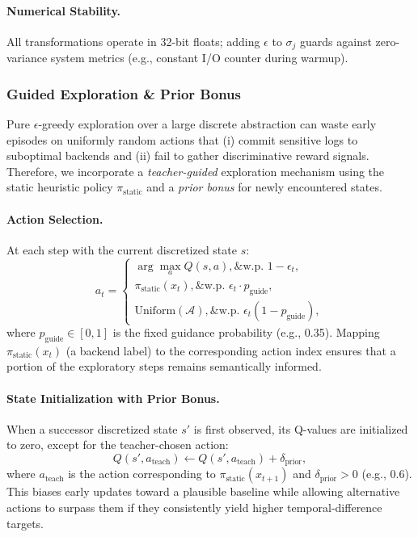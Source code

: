 \paragraph{Numerical Stability.}
All transformations operate in 32-bit floats; adding $\epsilon$ to $\sigma_j$ guards against zero-variance system metrics (e.g., constant I/O counter during warmup).

\subsubsection{Guided Exploration \& Prior Bonus}
\label{subsubsec:qlearn-guided}

Pure $\epsilon$-greedy exploration over a large discrete abstraction can waste early episodes on uniformly random actions that (i) commit sensitive logs to suboptimal backends and (ii) fail to gather discriminative reward signals. Therefore, we incorporate a \emph{teacher-guided} exploration mechanism using the static heuristic policy $\pi_{\text{static}}$ and a \emph{prior bonus} for newly encountered states.

\paragraph{Action Selection.}
At each step with the current discretized state $s$:
\[
a_t =
\begin{cases}
\arg\max_a Q(s,a),\& \text{w.p. } 1-\epsilon_t,\\[4pt]
\pi_{\text{static}}(x_t),\& \text{w.p. } \epsilon_t \cdot p_{\text{guide}},\\[4pt]
\text{Uniform}(\mathcal{A}),\& \text{w.p. } \epsilon_t (1-p_{\text{guide}}),
\end{cases}
\]
where $p_{\text{guide}} \in [0,1]$ is the fixed guidance probability (e.g., 0.35). Mapping $\pi_{\text{static}}(x_t)$ (a backend label) to the corresponding action index ensures that a portion of the exploratory steps remains semantically informed.

\paragraph{State Initialization with Prior Bonus.}
When a successor discretized state $s'$ is first observed, its Q-values are initialized to zero, except for the teacher-chosen action:
\[
Q(s', a_{\text{teach}}) \gets Q(s', a_{\text{teach}}) + \delta_{\text{prior}},
\]
where $a_{\text{teach}}$ is the action corresponding to $\pi_{\text{static}}(x_{t+1})$ and $\delta_{\text{prior}} > 0$ (e.g., 0.6). This biases early updates toward a plausible baseline while allowing alternative actions to surpass them if they consistently yield higher temporal-difference targets.

